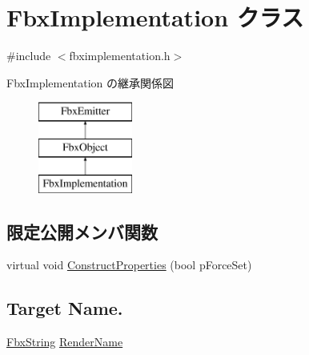 \hypertarget{class_fbx_implementation}{}\section{Fbx\+Implementation クラス}
\label{class_fbx_implementation}


{\ttfamily \#include $<$fbximplementation.\+h$>$}

Fbx\+Implementation の継承関係図\begin{figure}[H]
\begin{center}
\leavevmode
\includegraphics[height=3.000000cm]{class_fbx_implementation}
\end{center}
\end{figure}
\subsection*{限定公開メンバ関数}
\begin{DoxyCompactItemize}
\item 
virtual void \hyperlink{class_fbx_implementation_aba2d4d41452596b51bbb74efb21e863c}{Construct\+Properties} (bool p\+Force\+Set)
\end{DoxyCompactItemize}
\subsection*{Target Name.}
\begin{DoxyCompactItemize}
\item 
\hyperlink{class_fbx_string}{Fbx\+String} \hyperlink{class_fbx_implementation_a1c5e1e5480c227977a92668d77c13ce8}{Render\+Name}
\end{DoxyCompactItemize}
